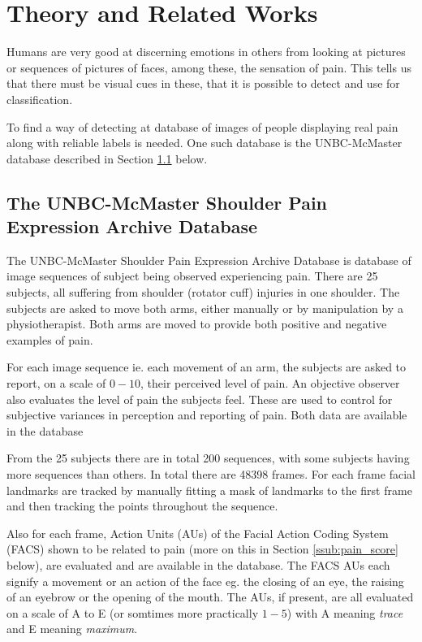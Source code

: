 \documentclass[Main]{subfiles}
\begin{document}
\section{Theory and Related Works} %
	\label{sec:theory_and_related_works}
	Humans are very good at discerning emotions in others from looking at pictures or sequences of pictures of faces, among these, the sensation of pain.
	This tells us that there must be visual cues in these, that it is possible to detect and use for classification.

	To find a way of detecting at database of images of people displaying real pain along with reliable labels is needed.
	One such database is the UNBC-McMaster database described in Section \ref{sub:unbc_mcmaster} below.

	\subsection{The UNBC-McMaster Shoulder Pain Expression Archive Database} %
		\label{sub:unbc_mcmaster}
		The UNBC-McMaster Shoulder Pain Expression Archive Database \cite{Lucey2011} is database of image sequences of subject being observed experiencing pain.
		There are 25 subjects, all suffering from shoulder (rotator cuff) injuries in one shoulder.
		The subjects are asked to move both arms, either manually or by manipulation by a physiotherapist.
		Both arms are moved to provide both positive and negative examples of pain.

		For each image sequence ie. each movement of an arm, the subjects are asked to report, on a scale of $0-10$, their perceived level of pain.
		An objective observer also evaluates the level of pain the subjects feel.
		These are used to control for subjective variances in perception and reporting of pain.
		Both data are available in the database

		From the 25 subjects there are in total 200 sequences, with some subjects having more sequences than others.
		In total there are 48398 frames.
		For each frame facial landmarks are tracked by manually fitting a mask of landmarks to the first frame and then tracking the points throughout the sequence.

		Also for each frame, Action Units (AUs) of the Facial Action Coding System (FACS) \cite{Ekman1978} shown to be related to pain (more on this in Section \ref{ssub:pain_score} below), are evaluated and are available in the database. 
		The FACS AUs each signify a movement or an action of the face eg. the closing of an eye, the raising of an eyebrow or the opening of the mouth.
		The AUs, if present, are all evaluated on a scale of A to E (or somtimes more practically $1-5$) with A meaning \emph{trace} and E meaning \emph{maximum}.
\end{document}
